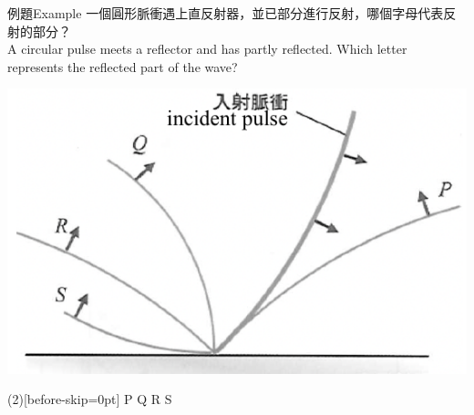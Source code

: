 \documentclass[beamer=true]{standalone}
\begin{document}
\begin{frame}{例題Example}
    一個圓形脈衝遇上直反射器，並已部分進行反射，哪個字母代表反射的部分？\\A circular pulse meets a reflector and has partly reflected. Which letter represents the reflected part of the wave?
    \par{\par\centering\includegraphics[width=.5\textwidth]{./img/ch2_cf_2024-05-24-14-24-19.png}\par}
    \begin{tasks}(2)[before-skip=0pt]
        \task P
        \task Q
        \task R
        \task S
    \end{tasks}

\end{frame}



\end{document}
